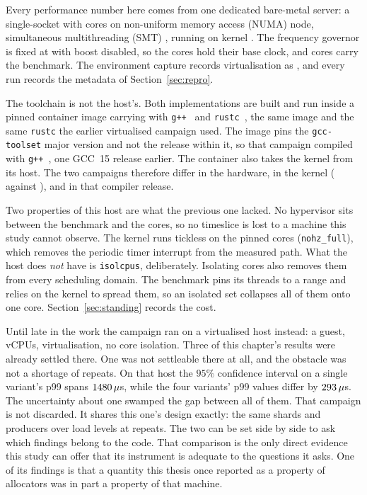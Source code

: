 \documentclass[english,oneside,a4paper,censored,csm,software-track-2020]{HYthesisML}
\begin{document}
Every performance number here comes from one dedicated bare-metal server: a single-socket
\MainCpu{} with \MainCores{} cores on \MainNumaNodes{} non-uniform memory access (NUMA) node,
simultaneous multithreading (SMT) \MainSmt{}, running \MainHostDistro{} on kernel \MainKernel{}.
The frequency governor is fixed
at \MainGovernor{} with boost disabled, so the cores hold their base clock, and cores \MainPinned{}
carry the benchmark. The environment capture records virtualisation as \MainVirt{}, and every run
records the metadata of Section~\ref{sec:repro}.

The toolchain is not the host's. Both implementations are built and run inside a pinned container
image carrying \MainDistro{} with \texttt{g++~\MainGpp} and \texttt{rustc~\MainRustc}, the same
image and the same \texttt{rustc} the earlier virtualised campaign used. The image pins the
\texttt{gcc-toolset} major version and not the release within it, so that campaign compiled with
\texttt{g++~\GuestGpp}, one GCC~15 release earlier. The container also takes the kernel from its
host. The two campaigns therefore differ in the hardware, in the kernel (\MainKernel{} against
\GuestKernel{}), and in that compiler release.

Two properties of this host are what the previous one lacked. No hypervisor sits between the
benchmark and the cores, so no timeslice is lost to a machine this study cannot observe. The
kernel runs tickless on the pinned cores (\texttt{nohz\_full}), which removes the periodic timer
interrupt from the measured path. What the host does \emph{not} have is \texttt{isolcpus},
deliberately. Isolating cores also removes them from every scheduling domain. The benchmark
pins its threads to a range and relies on the kernel to spread them, so an isolated set
collapses all of them onto one core. Section~\ref{sec:standing} records the cost.

Until late in the work the campaign ran on a virtualised host instead: a \GuestCpu{} guest,
\GuestCores{} vCPUs, \GuestVirt{} virtualisation, no core isolation. Three of this chapter's
results were already settled there. One was not settleable there at all, and the obstacle was
not a shortage of repeats. On that host the $95\%$ confidence interval on a single variant's p99
spans $1480\,\mu$s, while the four variants' p99 values differ by
$293\,\mu$s. The uncertainty about one swamped the gap between all of them.
That campaign is not discarded. It shares this one's design exactly: the same \GuestShards{}
shards and \GuestProducers{} producers over \GuestLoadLevels{} load levels at \GuestRepeats{}
repeats. The two can be set side by side to ask which findings belong to the code. That
comparison is the only direct evidence this study can offer that its instrument is adequate to
the questions it asks. One of its findings is that a quantity this thesis once reported as a
property of allocators was in part a property of that machine.
\end{document}
